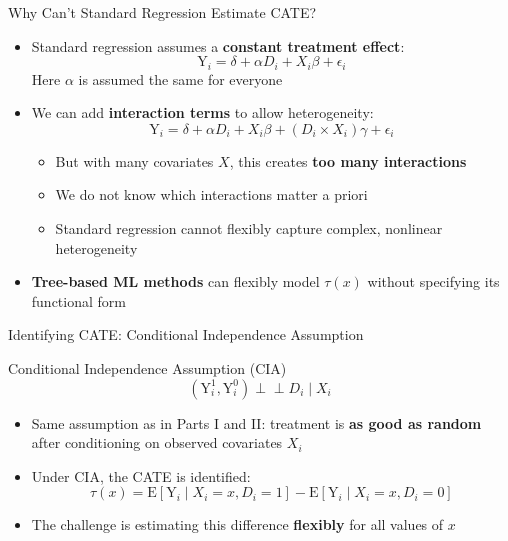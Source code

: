 \documentclass[hyperref={pdfpagelabels=false}]{beamer}
\newcommand{\indep}{\perp\!\!\!\perp}
\begin{document}
\begin{frame}{Why Can't Standard Regression Estimate CATE?}
	\begin{itemize}
		\item Standard regression assumes a \textbf{constant treatment effect}:
		\begin{equation*}
			\mathrm{Y}_i = \delta + \alpha D_i + X_i \beta + \epsilon_i
		\end{equation*}
		Here $\alpha$ is assumed the same for everyone
		\vspace{0.3cm}
		\item We can add \textbf{interaction terms} to allow heterogeneity:
		\begin{equation*}
			\mathrm{Y}_i = \delta + \alpha D_i + X_i \beta + (D_i \times X_i)\gamma + \epsilon_i
		\end{equation*}
		\vspace{0.2cm}
		\begin{itemize}
			\item But with many covariates $X$, this creates \textbf{too many interactions}
			\vspace{0.2cm}
			\item We do not know which interactions matter a priori
			\vspace{0.2cm}
			\item Standard regression cannot flexibly capture complex, nonlinear heterogeneity
		\end{itemize}
		\vspace{0.3cm}
		\item \textbf{Tree-based ML methods} can flexibly model $\tau(x)$ without specifying its functional form
	\end{itemize}
\end{frame}




\begin{frame}{Identifying CATE: Conditional Independence Assumption}
	\begin{block}{Conditional Independence Assumption (CIA)}
		\begin{equation*}
			(\mathrm{Y}^{1}_{i}, \mathrm{Y}^{0}_{i}) \indep D_{i} \mid X_{i}
		\end{equation*}
	\end{block}
	\begin{itemize}
		\vspace{0.3cm}
		\item Same assumption as in Parts I and II: treatment is \textbf{as good as random} after conditioning on observed covariates $X_i$
		\vspace{0.3cm}
		\item Under CIA, the CATE is identified:
		\begin{equation*}
			\tau(x) = \mathrm{E}[\mathrm{Y}_i \mid X_i = x, D_i = 1] - \mathrm{E}[\mathrm{Y}_i \mid X_i = x, D_i = 0]
		\end{equation*}
		\vspace{0.2cm}
		\item The challenge is estimating this difference \textbf{flexibly} for all values of $x$
	\end{itemize}
\end{frame}
\end{document}
